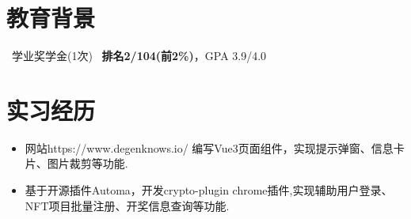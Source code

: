 \documentclass{resume}
\begin{document}
\begin{spacing}{1.2}



\vspace{0.2em}
\section{教育背景}
\ 学业奖学金(1次)
\ \textbf{排名2/104(前2\%)}，GPA 3.9/4.0

\vspace{0.2em}


\section{实习经历}

\begin{itemize}[parsep=0.8ex]
  \item 网站https://www.degenknows.io/ 编写Vue3页面组件，实现提示弹窗、信息卡片、图片裁剪等功能.
  \item 基于开源插件Automa，开发crypto-plugin chrome插件,实现辅助用户登录、NFT项目批量注册、开奖信息查询等功能.
\end{itemize}


\end{spacing}
\end{document}

